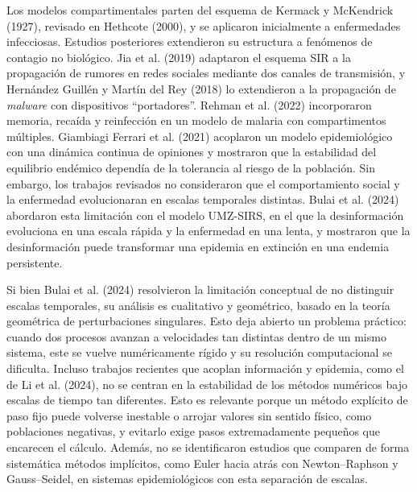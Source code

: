 Los modelos compartimentales parten del esquema de Kermack y McKendrick (1927), revisado en Hethcote (2000), y se aplicaron inicialmente a enfermedades infecciosas. Estudios posteriores extendieron su estructura a fenómenos de contagio no biológico. Jia et al. (2019) adaptaron el esquema SIR a la propagación de rumores en redes sociales mediante dos canales de transmisión, y Hernández Guillén y Martín del Rey (2018) lo extendieron a la propagación de \emph{malware} con dispositivos ``portadores''. Rehman et al. (2022) incorporaron memoria, recaída y reinfección en un modelo de malaria con compartimentos múltiples. Giambiagi Ferrari et al. (2021) acoplaron un modelo epidemiológico con una dinámica continua de opiniones y mostraron que la estabilidad del equilibrio endémico dependía de la tolerancia al riesgo de la población. Sin embargo, los trabajos revisados no consideraron que el comportamiento social y la enfermedad evolucionaran en escalas temporales distintas. Bulai et al. (2024) abordaron esta limitación con el modelo UMZ-SIRS, en el que la desinformación evoluciona en una escala rápida y la enfermedad en una lenta, y mostraron que la desinformación puede transformar una epidemia en extinción en una endemia persistente.

Si bien Bulai et al. (2024) resolvieron la limitación conceptual de no distinguir escalas temporales, su análisis es cualitativo y geométrico, basado en la teoría geométrica de perturbaciones singulares. Esto deja abierto un problema práctico: cuando dos procesos avanzan a velocidades tan distintas dentro de un mismo sistema, este se vuelve numéricamente rígido y su resolución computacional se dificulta. Incluso trabajos recientes que acoplan información y epidemia, como el de Li et al. (2024), no se centran en la estabilidad de los métodos numéricos bajo escalas de tiempo tan diferentes. Esto es relevante porque un método explícito de paso fijo puede volverse inestable o arrojar valores sin sentido físico, como poblaciones negativas, y evitarlo exige pasos extremadamente pequeños que encarecen el cálculo. Además, no se identificaron estudios que comparen de forma sistemática métodos implícitos, como Euler hacia atrás con Newton--Raphson y Gauss--Seidel, en sistemas epidemiológicos con esta separación de escalas.

